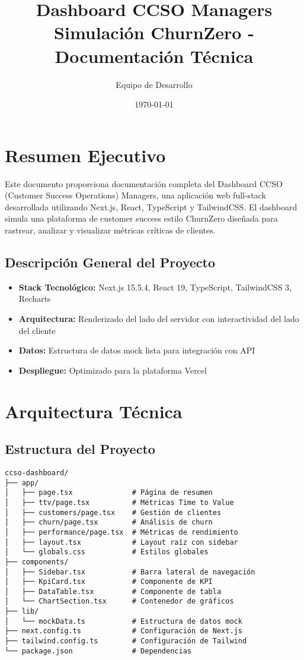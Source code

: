 \documentclass[12pt,a4paper]{article}
\title{\textbf{Dashboard CCSO Managers} \\ \large Simulación ChurnZero - Documentación Técnica}
\author{Equipo de Desarrollo}
\date{\today}
\begin{document}
\maketitle
\newpage

\tableofcontents
\newpage

\section{Resumen Ejecutivo}

Este documento proporciona documentación completa del Dashboard CCSO (Customer Success Operations) Managers, una aplicación web full-stack desarrollada utilizando Next.js, React, TypeScript y TailwindCSS. El dashboard simula una plataforma de customer success estilo ChurnZero diseñada para rastrear, analizar y visualizar métricas críticas de clientes.

\subsection{Descripción General del Proyecto}
\begin{itemize}
    \item \textbf{Stack Tecnológico:} Next.js 15.5.4, React 19, TypeScript, TailwindCSS 3, Recharts
    \item \textbf{Arquitectura:} Renderizado del lado del servidor con interactividad del lado del cliente
    \item \textbf{Datos:} Estructura de datos mock lista para integración con API
    \item \textbf{Despliegue:} Optimizado para la plataforma Vercel
\end{itemize}

\section{Arquitectura Técnica}

\subsection{Estructura del Proyecto}
\begin{verbatim}
ccso-dashboard/
├── app/
│   ├── page.tsx              # Página de resumen
│   ├── ttv/page.tsx          # Métricas Time to Value
│   ├── customers/page.tsx    # Gestión de clientes
│   ├── churn/page.tsx        # Análisis de churn
│   ├── performance/page.tsx  # Métricas de rendimiento
│   ├── layout.tsx            # Layout raíz con sidebar
│   └── globals.css           # Estilos globales
├── components/
│   ├── Sidebar.tsx           # Barra lateral de navegación
│   ├── KpiCard.tsx           # Componente de KPI
│   ├── DataTable.tsx         # Componente de tabla
│   └── ChartSection.tsx      # Contenedor de gráficos
├── lib/
│   └── mockData.ts           # Estructura de datos mock
├── next.config.ts            # Configuración de Next.js
├── tailwind.config.ts        # Configuración de Tailwind
└── package.json              # Dependencias
\end{verbatim}
\end{document}
